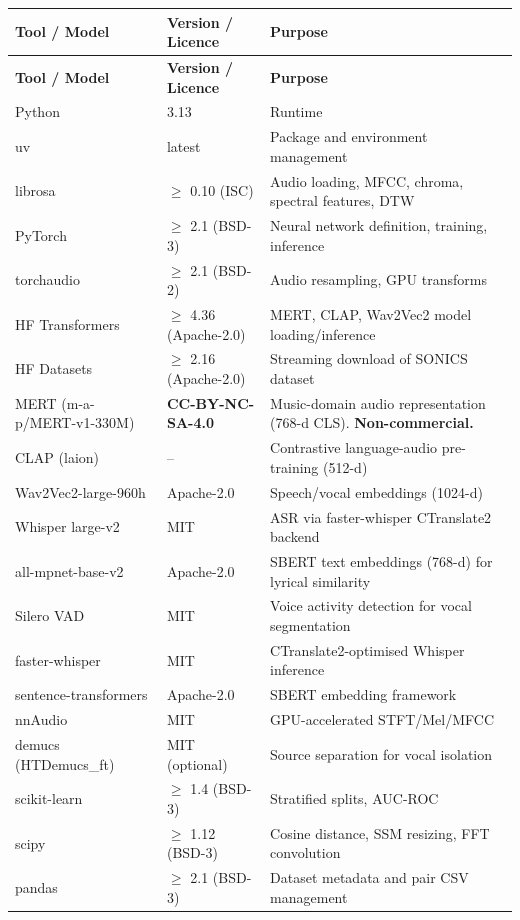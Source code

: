 \documentclass[11pt,a4paper]{article}
\begin{document}
\begin{longtable}{p{4.2cm} p{3.5cm} p{6.5cm}}
\toprule
\textbf{Tool / Model} & \textbf{Version / Licence} & \textbf{Purpose} \\
\midrule
\endfirsthead
\toprule
\textbf{Tool / Model} & \textbf{Version / Licence} & \textbf{Purpose} \\
\midrule
\endhead
Python & 3.13 & Runtime \\
uv & latest & Package and environment management \\
librosa & $\geq$ 0.10 (ISC) & Audio loading, MFCC, chroma, spectral features, DTW \\
PyTorch & $\geq$ 2.1 (BSD-3) & Neural network definition, training, inference \\
torchaudio & $\geq$ 2.1 (BSD-2) & Audio resampling, GPU transforms \\
HF Transformers & $\geq$ 4.36 (Apache-2.0) & MERT, CLAP, Wav2Vec2 model loading/inference \\
HF Datasets & $\geq$ 2.16 (Apache-2.0) & Streaming download of SONICS dataset \\
MERT (m-a-p/MERT-v1-330M) & \textbf{CC-BY-NC-SA-4.0} & Music-domain audio representation (768-d CLS). \textbf{Non-commercial.} \\
CLAP (laion) & -- & Contrastive language-audio pre-training (512-d) \\
Wav2Vec2-large-960h & Apache-2.0 & Speech/vocal embeddings (1024-d) \\
Whisper large-v2 & MIT & ASR via faster-whisper CTranslate2 backend \\
all-mpnet-base-v2 & Apache-2.0 & SBERT text embeddings (768-d) for lyrical similarity \\
Silero VAD & MIT & Voice activity detection for vocal segmentation \\
faster-whisper & MIT & CTranslate2-optimised Whisper inference \\
sentence-transformers & Apache-2.0 & SBERT embedding framework \\
nnAudio & MIT & GPU-accelerated STFT/Mel/MFCC \\
demucs (HTDemucs\_ft) & MIT (optional) & Source separation for vocal isolation \\
scikit-learn & $\geq$ 1.4 (BSD-3) & Stratified splits, AUC-ROC \\
scipy & $\geq$ 1.12 (BSD-3) & Cosine distance, SSM resizing, FFT convolution \\
pandas & $\geq$ 2.1 (BSD-3) & Dataset metadata and pair CSV management \\

\end{longtable}
\end{document}
